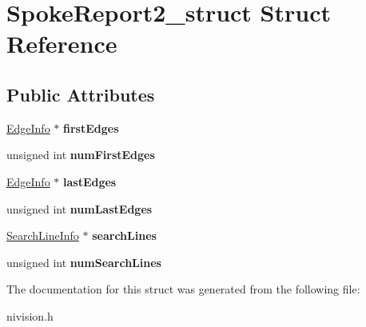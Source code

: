 \hypertarget{structSpokeReport2__struct}{
\section{SpokeReport2\_\-struct Struct Reference}
\label{structSpokeReport2__struct}
}
\subsection*{Public Attributes}
\begin{DoxyCompactItemize}
\item 
\hypertarget{structSpokeReport2__struct_a856bf76e1fdfa54ea07133efd67e42c0}{
\hyperlink{structEdgeInfo__struct}{EdgeInfo} $\ast$ {\bfseries firstEdges}}
\label{structSpokeReport2__struct_a856bf76e1fdfa54ea07133efd67e42c0}

\item 
\hypertarget{structSpokeReport2__struct_a37e14d096657e9e89c8089829c311d59}{
unsigned int {\bfseries numFirstEdges}}
\label{structSpokeReport2__struct_a37e14d096657e9e89c8089829c311d59}

\item 
\hypertarget{structSpokeReport2__struct_a30a1c103d8919f6f630d12ff40b50e8a}{
\hyperlink{structEdgeInfo__struct}{EdgeInfo} $\ast$ {\bfseries lastEdges}}
\label{structSpokeReport2__struct_a30a1c103d8919f6f630d12ff40b50e8a}

\item 
\hypertarget{structSpokeReport2__struct_a5f65269e1e3bd9482d36da7f92bcb025}{
unsigned int {\bfseries numLastEdges}}
\label{structSpokeReport2__struct_a5f65269e1e3bd9482d36da7f92bcb025}

\item 
\hypertarget{structSpokeReport2__struct_acc2432884795e230a4f1325a813a8ae8}{
\hyperlink{structSearchLineInfo__struct}{SearchLineInfo} $\ast$ {\bfseries searchLines}}
\label{structSpokeReport2__struct_acc2432884795e230a4f1325a813a8ae8}

\item 
\hypertarget{structSpokeReport2__struct_ac696a0130a89333db098195eb5f305bc}{
unsigned int {\bfseries numSearchLines}}
\label{structSpokeReport2__struct_ac696a0130a89333db098195eb5f305bc}

\end{DoxyCompactItemize}


The documentation for this struct was generated from the following file:\begin{DoxyCompactItemize}
\item 
nivision.h\end{DoxyCompactItemize}

